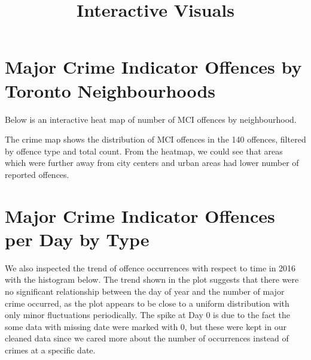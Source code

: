 \documentclass[
]{article}
\title{Interactive Visuals}
\author{}
\date{\vspace{-2.5em}}
\begin{document}
\maketitle

\hypertarget{major-crime-indicator-offences-by-toronto-neighbourhoods}{%
\section{Major Crime Indicator Offences by Toronto
Neighbourhoods}\label{major-crime-indicator-offences-by-toronto-neighbourhoods}}

Below is an interactive heat map of number of MCI offences by
neighbourhood.

The crime map shows the distribution of MCI offences in the 140
offences, filtered by offence type and total count. From the heatmap, we
could see that areas which were further away from city centers and urban
areas had lower number of reported offences.

\hypertarget{major-crime-indicator-offences-per-day-by-type}{%
\section{Major Crime Indicator Offences per Day by
Type}\label{major-crime-indicator-offences-per-day-by-type}}

We also inspected the trend of offence occurrences with respect to time
in 2016 with the histogram below. The trend shown in the plot suggests
that there were no significant relationship between the day of year and
the number of major crime occurred, as the plot appears to be close to a
uniform distribution with only minor fluctuations periodically. The
spike at Day 0 is due to the fact the some data with missing date were
marked with 0, but these were kept in our cleaned data since we cared
more about the number of occurrences instead of crimes at a specific
date.
\end{document}
